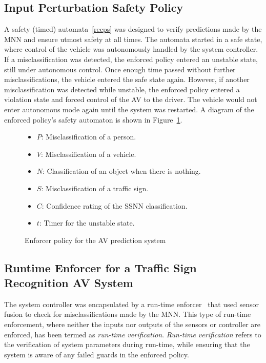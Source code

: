 \subsection{Input Perturbation Safety Policy}
A safety (timed) automata~\ref{recps} was designed to verify predictions made by the \ac{MNN} and ensure utmost safety at all times.
The automata started in a safe state, where control of the vehicle was autonomously handled by the system controller.
If a misclassification was detected, the enforced policy entered an unstable state, still under autonomous control. 
Once enough time passed without further misclassifications, the vehicle entered the safe state again.
However, if another misclassification was detected while unstable, the enforced policy entered a violation state and forced control of the \ac{AV} to the driver.
The vehicle would not enter autonomous mode again until the system was restarted.
A diagram of the enforced policy's safety automaton is shown in Figure~\ref{fig:signrte}.
\begin{figure}[t]
	\centering
	\scalebox{1.3}{}
	\begin{itemize}
		\item $P$: Misclassification of a person.
		\item $V$: Misclassification of a vehicle.
		\item $N$: Classification of an object when there is nothing.
		\item $S$: Misclassification of a traffic sign.
		\item $C$: Confidence rating of the \ac{SSNN} classification.
		\item $t$: Timer for the unstable state.
	\end{itemize}
	
	\caption{Enforcer policy for the \acf{AV} prediction system}
	\label{fig:signrte}
\end{figure}

\subsection{Runtime Enforcer for a Traffic Sign Recognition AV System}
The system controller was encapsulated by a run-time enforcer~\cite{recps} that used sensor fusion to check for misclassifications made by the \ac{MNN}.
This type of run-time enforcement, where neither the inputs nor outputs of the sensors or controller are enforced, has been termed as \textit{run-time verification}.
\textit{Run-time verification} refers to the verification of system parameters during run-time, while ensuring that the system is aware of any failed guards in the enforced policy.

